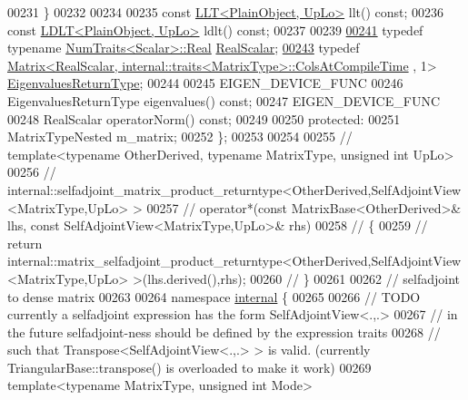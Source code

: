 \begin{DoxyCode}
00231     \}
00232 
00234 
00235     \textcolor{keyword}{const} \hyperlink{group___cholesky___module_class_eigen_1_1_l_l_t}{LLT<PlainObject, UpLo>} llt() \textcolor{keyword}{const};
00236     \textcolor{keyword}{const} \hyperlink{group___cholesky___module_class_eigen_1_1_l_d_l_t}{LDLT<PlainObject, UpLo>} ldlt() \textcolor{keyword}{const};
00237 
00239 
\hyperlink{group___core___module_af9f0234ebeae4c4ca512bcd5fb5e8bb1}{00241}     \textcolor{keyword}{typedef} \textcolor{keyword}{typename} \hyperlink{group___core___module_struct_eigen_1_1_num_traits}{NumTraits<Scalar>::Real} \hyperlink{group___core___module_af9f0234ebeae4c4ca512bcd5fb5e8bb1}{RealScalar};
\hyperlink{group___core___module_a8ae92703d920130b38a383f8b165146c}{00243}     \textcolor{keyword}{typedef} \hyperlink{group___core___module_class_eigen_1_1_matrix}{Matrix<RealScalar, internal::traits<MatrixType>::ColsAtCompileTime}
      , 1> \hyperlink{group___core___module_a8ae92703d920130b38a383f8b165146c}{EigenvaluesReturnType};
00244 
00245     EIGEN\_DEVICE\_FUNC
00246     EigenvaluesReturnType eigenvalues() \textcolor{keyword}{const};
00247     EIGEN\_DEVICE\_FUNC
00248     RealScalar operatorNorm() \textcolor{keyword}{const};
00249 
00250   \textcolor{keyword}{protected}:
00251     MatrixTypeNested m\_matrix;
00252 \};
00253 
00254 
00255 \textcolor{comment}{// template<typename OtherDerived, typename MatrixType, unsigned int UpLo>}
00256 \textcolor{comment}{// internal::selfadjoint\_matrix\_product\_returntype<OtherDerived,SelfAdjointView<MatrixType,UpLo> >}
00257 \textcolor{comment}{// operator*(const MatrixBase<OtherDerived>& lhs, const SelfAdjointView<MatrixType,UpLo>& rhs)}
00258 \textcolor{comment}{// \{}
00259 \textcolor{comment}{//   return internal::matrix\_selfadjoint\_product\_returntype<OtherDerived,SelfAdjointView<MatrixType,UpLo>
       >(lhs.derived(),rhs);}
00260 \textcolor{comment}{// \}}
00261 
00262 \textcolor{comment}{// selfadjoint to dense matrix}
00263 
00264 \textcolor{keyword}{namespace }\hyperlink{namespaceinternal}{internal} \{
00265 
00266 \textcolor{comment}{// TODO currently a selfadjoint expression has the form SelfAdjointView<.,.>}
00267 \textcolor{comment}{//      in the future selfadjoint-ness should be defined by the expression traits}
00268 \textcolor{comment}{//      such that Transpose<SelfAdjointView<.,.> > is valid. (currently TriangularBase::transpose() is
       overloaded to make it work)}
00269 \textcolor{keyword}{template}<\textcolor{keyword}{typename} MatrixType, \textcolor{keywordtype}{unsigned} \textcolor{keywordtype}{int} Mode>

\end{DoxyCode}
